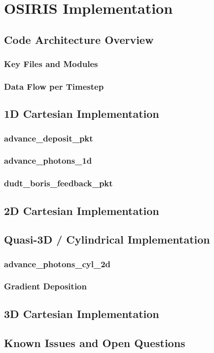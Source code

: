 \newpage
\section{OSIRIS Implementation}

\subsection{Code Architecture Overview}
    \subsubsection{Key Files and Modules}
    \subsubsection{Data Flow per Timestep}


\subsection{1D Cartesian Implementation}
    \subsubsection{advance\_deposit\_pkt}
    \subsubsection{advance\_photons\_1d}
    \subsubsection{dudt\_boris\_feedback\_pkt}

\subsection{2D Cartesian Implementation}



\subsection{Quasi-3D / Cylindrical Implementation}
    \subsubsection{advance\_photons\_cyl\_2d}
    \subsubsection{Gradient Deposition}


\subsection{3D Cartesian Implementation}

\subsection{Known Issues and Open Questions}



